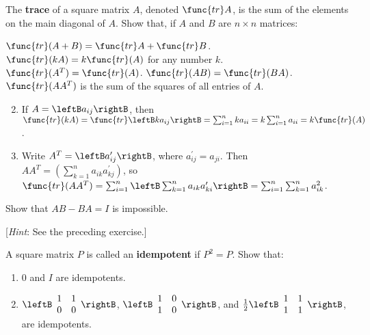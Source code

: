 \begin{multicols}{2}
\begin{ex}
The \textbf{trace} of a square matrix $A$, denoted $\func{tr }A$, is the sum of the elements on the main diagonal of $A$. Show that, if $A$ and $B$ are $n \times n$ matrices:
\begin{exenumerate}
\exitem* $\func{tr}(A + B) = \func{tr }A + \func{tr }B$.
\exitem* $\func{tr}(kA) = k \func{tr}(A)$ for any number $k$.
\exitem $\func{tr}(A^{T}) = \func{tr}(A)$.
\exitem $\func{tr}(AB) = \func{tr}(BA)$.
\exitem* $\func{tr}(AA^{T})$ is the sum of the squares of all entries of $A$.
\end{exenumerate}
\begin{sol}
\begin{enumerate}[label={\alph*.}]
\setcounter{enumi}{1}
\item  If $A = \leftB a_{ij} \rightB$, then $\func{tr}(kA) = \func{tr}\leftB ka_{ij} \rightB = \sum_{i=1}^{n} ka_{ii} = k\sum_{i=1}^{n} a_{ii} = k \func{tr}(A)$.


\setcounter{enumi}{4}
\item  Write $A^{T} = \leftB a_{ij}^\prime \rightB$, where $a_{ij}^\prime = a_{ji}$. Then $AA^{T} = \left( \sum_{k=1}^{n} a_{ik}a_{kj}^\prime \right)$, so $\func{tr}(AA^{T}) = \sum_{i=1}^{n} \leftB \sum_{k=1}^{n} a_{ik}a_{ki}^\prime \rightB = \sum_{i=1}^{n} \sum_{k=1}^{n} a_{ik}^{2}$.


\end{enumerate}
\end{sol}
\end{ex}

\begin{ex}
Show that $AB - BA = I$ is impossible.


[\textit{Hint}: See the preceding exercise.]
\end{ex}


\begin{ex}
A square matrix $P$ is called an \newline \textbf{idempotent} if $P^{2} = P$. Show that:


\begin{enumerate}[label={\alph*.}]
\item $0$ and $I$ are idempotents.

\item $\leftB \begin{array}{rr}
1 & 1 \\
0 & 0
\end{array} \rightB$, $\leftB \begin{array}{rr}
1 & 0 \\
1 & 0
\end{array} \rightB$, and $\frac{1}{2} \leftB \begin{array}{rr}
 1 & 1 \\
 1 & 1
 \end{array} \rightB$, are idempotents.


\end{enumerate}
\end{ex}
\end{multicols}
